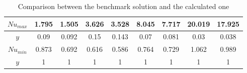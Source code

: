 \begin{table}[h]
\begin{tabular}{c|c|c|c|c|c|c|c|c|}
		\multicolumn{1}{|c|}{$Nu_{max}$} & 1.795                    & 1.505                & 3.626                   & 3.528                & 8.045                   & 7.717                & 20.019                   & 17.925               \\ \hline
		\multicolumn{1}{|c|}{$y$}     & 0.09                      & 0.092                & 0.15                      & 0.143                & 0.07                      & 0.081                & 0.03                      & 0.038               \\ \hline
		\multicolumn{1}{|c|}{$Nu_{min}$} & 0.873                  & 0.692                & 0.616                  & 0.586                & 0.764                  & 0.729                & 1.062                   & 0.989                \\ \hline
		\multicolumn{1}{|c|}{$y$}     & 1                         & 1                    & 1                         & 1                    & 1                         & 1                    & 1                         & 1                    \\ \hline
	\end{tabular}
	\caption[Comparison between the benchmark solution and the calculated one]{Comparison between the benchmark solution and the calculated one \cite{DeVahlDavis1983}}
\end{table}

